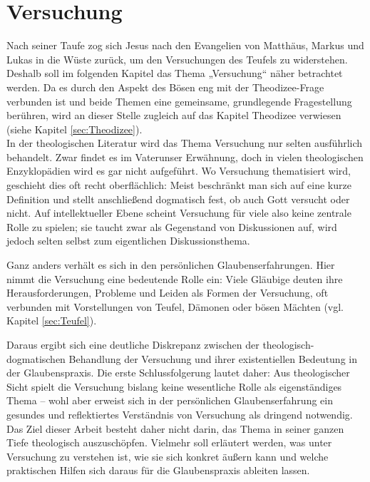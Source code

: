 \chapter{Versuchung}
Nach seiner Taufe zog sich Jesus nach den Evangelien von Matthäus, Markus und Lukas in die Wüste zurück, um den Versuchungen des Teufels zu widerstehen. Deshalb soll im folgenden Kapitel das Thema „Versuchung“ näher betrachtet werden. Da es durch den Aspekt des Bösen eng mit der Theodizee-Frage verbunden ist und beide Themen eine gemeinsame, grundlegende Fragestellung berühren, wird an dieser Stelle zugleich auf das Kapitel Theodizee verwiesen (siehe Kapitel \ref{sec:Theodizee}).\\

In der theologischen Literatur wird das Thema Versuchung nur selten ausführlich behandelt. Zwar findet es im Vaterunser Erwähnung, doch in vielen theologischen Enzyklopädien wird es gar nicht aufgeführt. Wo Versuchung thematisiert wird, geschieht dies oft recht oberflächlich: Meist beschränkt man sich auf eine kurze Definition und stellt anschließend dogmatisch fest, ob auch Gott versucht oder nicht. Auf intellektueller Ebene scheint Versuchung für viele also keine zentrale Rolle zu spielen; sie taucht zwar als Gegenstand von Diskussionen auf, wird jedoch selten selbst zum eigentlichen Diskussionsthema.\

Ganz anders verhält es sich in den persönlichen Glaubenserfahrungen. Hier nimmt die Versuchung eine bedeutende Rolle ein: Viele Gläubige deuten ihre Herausforderungen, Probleme und Leiden als Formen der Versuchung, oft verbunden mit Vorstellungen von Teufel, Dämonen oder bösen Mächten (vgl. Kapitel \ref{sec:Teufel}).\

Daraus ergibt sich eine deutliche Diskrepanz zwischen der theologisch-dogmatischen Behandlung der Versuchung und ihrer existentiellen Bedeutung in der Glaubenspraxis. Die erste Schlussfolgerung lautet daher: Aus theologischer Sicht spielt die Versuchung bislang keine wesentliche Rolle als eigenständiges Thema – wohl aber erweist sich in der persönlichen Glaubenserfahrung ein gesundes und reflektiertes Verständnis von Versuchung als dringend notwendig.\\

Das Ziel dieser Arbeit besteht daher nicht darin, das Thema in seiner ganzen Tiefe theologisch auszuschöpfen. Vielmehr soll erläutert werden, was unter Versuchung zu verstehen ist, wie sie sich konkret äußern kann und welche praktischen Hilfen sich daraus für die Glaubenspraxis ableiten lassen. \\

